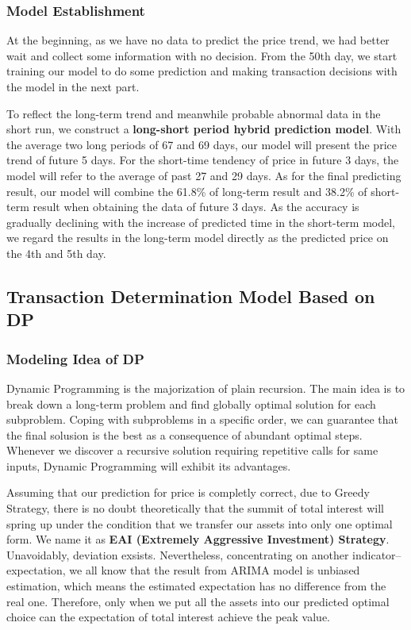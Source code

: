 \documentclass{mcmthesis}
\begin{document}
\subsubsection{Model Establishment}

At the beginning, as we have no data to predict the price trend, we had better wait and collect some information with no decision. From the 50th day, we start training our model to do some prediction and making transaction decisions with the model in the next part.
\par To reflect the long-term trend and meanwhile probable abnormal data in the short run, we construct a \textbf{long-short period hybrid prediction model}. With the average two long periods of 67 and 69 days, our model will present the price trend of future 5 days. For the short-time tendency of price in future 3 days, the model will refer to the average of past 27 and 29 days. As for the final predicting result, our model will combine the 61.8\% of long-term result and 38.2\% of short-term result when obtaining the data of future 3 days. As the accuracy is gradually declining with the increase of predicted time in the short-term model, we regard the results in the long-term model directly as the predicted price on the 4th and 5th day.

\subsection{Transaction Determination Model Based on DP}

\subsubsection{Modeling Idea of DP}

\par Dynamic Programming is the majorization of plain recursion. The main idea is to break down a long-term problem and find globally optimal solution for each subproblem. Coping with subproblems in a specific order, we can guarantee that the final solusion is the best as a consequence of abundant optimal steps. Whenever we discover a recursive solution requiring repetitive calls for same inputs, Dynamic Programming will exhibit its advantages. 
\par Assuming that our prediction for price is completly correct, due to Greedy Strategy, there is no doubt theoretically that the summit of total interest will spring up under the condition that we transfer our assets into only one optimal form. We name it as \textbf{EAI (Extremely Aggressive Investment) Strategy}. Unavoidably, deviation exsists. Nevertheless, concentrating on another indicator--expectation, we all know that the result from ARIMA model is unbiased estimation, which means the estimated expectation has no difference from the real one. Therefore, only when we put all the assets into our predicted optimal choice can the expectation of total interest achieve the peak value. 
\end{document}

